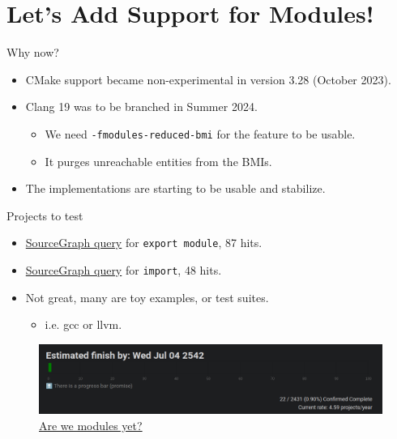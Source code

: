 \documentclass[aspectratio=169]{beamer}
\begin{document}

\section*{Let's Add Support for Modules!}

\begin{frame}{Why now?}
  \begin{itemize}
    \item CMake support became non-experimental in version 3.28 (October 2023).
    \item Clang 19 was to be branched in Summer 2024.
          \begin{itemize}
            \item We need \texttt{-fmodules-reduced-bmi} for the feature to be usable.
            \item It purges unreachable entities from the BMIs.
          \end{itemize}
    \item The implementations are starting to be usable and stabilize.
  \end{itemize}
\end{frame}

\begin{frame}{Projects to test}
  \begin{itemize}
    \item \href{https://tinyurl.com/rwd48zpb}{SourceGraph query} for \texttt{export  module}, 87 hits.
    \item \href{https://tinyurl.com/ejey2pnt}{SourceGraph query} for \texttt{import}, 48 hits.
    \item Not great, many are toy examples, or test suites.
          \begin{itemize}
            \item i.e. gcc or llvm.
          \end{itemize}
  \end{itemize}
  \begin{figure}
    \includegraphics[width=\linewidth]{arewemodules.png}
    \caption{\href{https://arewemodulesyet.org/}{Are we modules yet?}}
  \end{figure}
\end{frame}
\end{document}
